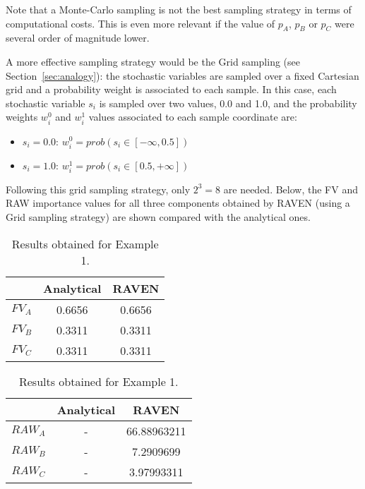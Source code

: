 Note that a Monte-Carlo sampling is not the best sampling strategy in terms of computational 
costs. This is even more relevant if the value of $p_A$, $p_B$ or $p_C$ were several order of 
magnitude lower. 

A more effective sampling strategy would be the Grid sampling (see Section~\ref{sec:analogy}): 
the stochastic variables 
are sampled over a fixed Cartesian grid and a probability weight is associated to each sample. 
In this case, each stochastic variable $s_i$ is sampled over two values, 0.0 and 1.0, and the 
probability weights $w_i^0$ and $w_i^1$ values associated to each sample coordinate are:
\begin{itemize}
  \item $s_i=0.0$: $w_i^0=prob(s_i \in [-\infty,0.5])$
  \item $s_i=1.0$: $w_i^1=prob(s_i \in [0.5,+\infty])$
\end{itemize}
Following this grid sampling strategy, only $2^3=8$ are needed.
Below, the FV and RAW importance values for all three components obtained by RAVEN (using a Grid sampling 
strategy) are shown compared with the analytical ones.

\begin{table}
    \caption{Results obtained for Example 1.}
    \begin{minipage}{.5\linewidth}
      \centering
      \begin{tabular}{c | c | c } 
        \hline 
         & Analytical & RAVEN \\ 
        \hline 
        $FV_A$ & 0.6656 & 0.6656   \\
        $FV_B$ & 0.3311 & 0.3311   \\
        $FV_C$ & 0.3311 & 0.3311   \\
        \hline 
      \end{tabular}
    \end{minipage}%
    \begin{minipage}{.5\linewidth}
      \centering
      \begin{tabular}{c | c | c } 
        \hline 
         & Analytical & RAVEN \\ 
        \hline 
        $RAW_A$ & - & 66.88963211  \\
        $RAW_B$ & - & 7.2909699    \\
        $RAW_C$ & - & 3.97993311   \\
        \hline 
      \end{tabular}
    \end{minipage} 
\end{table}

